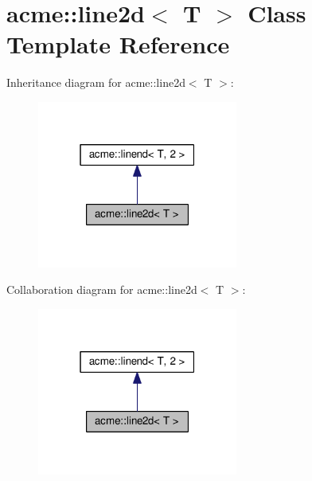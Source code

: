 \hypertarget{classacme_1_1line2d}{}\section{acme\+:\+:line2d$<$ T $>$ Class Template Reference}
\label{classacme_1_1line2d}


Inheritance diagram for acme\+:\+:line2d$<$ T $>$\+:
\nopagebreak
\begin{figure}[H]
\begin{center}
\leavevmode
\includegraphics[width=187pt]{d0/d5c/classacme_1_1line2d__inherit__graph}
\end{center}
\end{figure}


Collaboration diagram for acme\+:\+:line2d$<$ T $>$\+:
\nopagebreak
\begin{figure}[H]
\begin{center}
\leavevmode
\includegraphics[width=187pt]{d0/d89/classacme_1_1line2d__coll__graph}
\end{center}
\end{figure}
